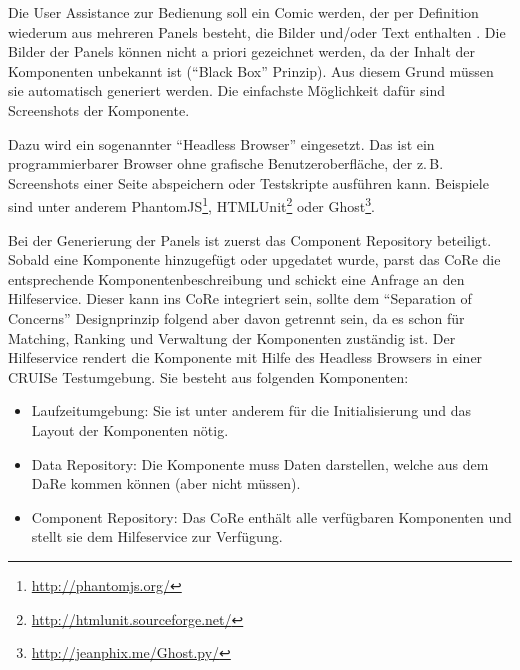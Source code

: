 \documentclass[
	headsepline,
	footsepline,
	fontsize=12pt,
	bibliography=totoc
]{scrbook}
\begin{document}


Die User Assistance zur Bedienung soll ein Comic werden, der per Definition wiederum aus mehreren Panels besteht, die Bilder und/oder Text enthalten \cite{McCloud1994}. Die Bilder der Panels können nicht a priori gezeichnet werden, da der Inhalt der Komponenten unbekannt ist (\enquote{Black Box} Prinzip). Aus diesem Grund müssen sie automatisch generiert werden. Die einfachste Möglichkeit dafür sind Screenshots der Komponente.


Dazu wird ein sogenannter \enquote{Headless Browser} eingesetzt. Das ist ein programmierbarer Browser ohne grafische Benutzeroberfläche, der z.\,B. Screenshots einer Seite abspeichern oder Testskripte ausführen kann. Beispiele sind unter anderem PhantomJS\footnote{\url{http://phantomjs.org/}}, HTMLUnit\footnote{\url{http://htmlunit.sourceforge.net/}} oder Ghost\footnote{\url{http://jeanphix.me/Ghost.py/}}.


Bei der Generierung der Panels ist zuerst das Component Repository beteiligt. Sobald eine Komponente hinzugefügt oder upgedatet wurde, parst das CoRe die entsprechende Komponentenbeschreibung und schickt eine Anfrage an den Hilfeservice. Dieser kann ins CoRe integriert sein, sollte dem \enquote{Separation of Concerns} Designprinzip folgend aber davon getrennt sein, da es schon für Matching, Ranking und Verwaltung der Komponenten zuständig ist. Der Hilfeservice rendert die Komponente mit Hilfe des Headless Browsers in einer CRUISe Testumgebung. Sie besteht aus folgenden Komponenten:

\begin{itemize}
	\item Laufzeitumgebung: Sie ist unter anderem für die Initialisierung und das Layout der Komponenten nötig.
	\item Data Repository: Die Komponente muss Daten darstellen, welche aus dem DaRe kommen können (aber nicht müssen).
	\item Component Repository: Das CoRe enthält alle verfügbaren Komponenten und stellt sie dem Hilfeservice zur Verfügung.
\end{itemize}
\end{document}
